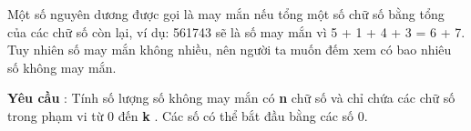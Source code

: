 Một số nguyên dương được gọi là may mắn nếu tổng một số chữ số bằng tổng của các chữ số còn lại, ví dụ: 561743 sẽ là số may mắn vì 5 + 1 + 4 + 3 = 6 + 7. Tuy nhiên số may mắn không nhiều, nên người ta muốn đếm xem có bao nhiêu số không may mắn.  

\textbf{Yêu cầu}   : Tính số lượng số không may mắn có   \textbf{n}   chữ số và chỉ chứa các chữ số trong phạm vi từ 0 đến   \textbf{k}   . Các số có thể bắt đầu bằng các số 0.